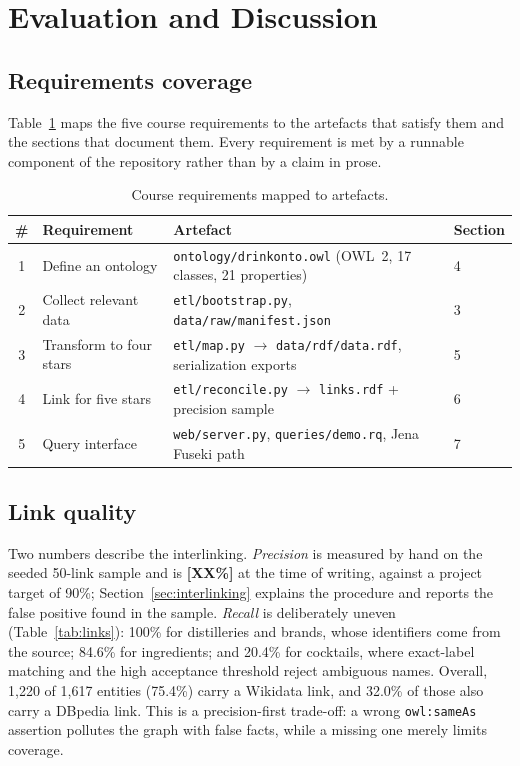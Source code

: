 \section{Evaluation and Discussion}
\label{sec:evaluation}

\subsection{Requirements coverage}

Table~\ref{tab:requirements} maps the five course requirements to the artefacts
that satisfy them and the sections that document them. Every requirement is met
by a runnable component of the repository rather than by a claim in prose.

\begin{table}[h]
  \centering
  \small
  \begin{tabular}{@{}clll@{}}
    \toprule
    \# & Requirement & Artefact & Section \\
    \midrule
    1 & Define an ontology & \texttt{ontology/drinkonto.owl} (OWL~2, 17 classes, 21 properties) & 4 \\
    2 & Collect relevant data & \texttt{etl/bootstrap.py}, \texttt{data/raw/manifest.json} & 3 \\
    3 & Transform to four stars & \texttt{etl/map.py} $\rightarrow$ \texttt{data/rdf/data.rdf}, serialization exports & 5 \\
    4 & Link for five stars & \texttt{etl/reconcile.py} $\rightarrow$ \texttt{links.rdf} + precision sample & 6 \\
    5 & Query interface & \texttt{web/server.py}, \texttt{queries/demo.rq}, Jena Fuseki path & 7 \\
    \bottomrule
  \end{tabular}
  \caption{Course requirements mapped to artefacts.}
  \label{tab:requirements}
\end{table}

\subsection{Link quality}

Two numbers describe the interlinking. \emph{Precision} is measured by hand on
the seeded 50-link sample and is \textbf{[XX\%]} at the time of writing, against
a project target of 90\%; Section~\ref{sec:interlinking} explains the procedure and reports the
false positive found in the sample. \emph{Recall} is deliberately uneven
(Table~\ref{tab:links}): 100\% for distilleries and brands, whose identifiers
come from the source; 84.6\% for ingredients; and 20.4\% for cocktails, where
exact-label matching and the high acceptance threshold reject ambiguous names.
Overall, 1{,}220 of 1{,}617 entities (75.4\%) carry a Wikidata link, and 32.0\%
of those also carry a DBpedia link. This is a precision-first trade-off: a
wrong \texttt{owl:sameAs} assertion pollutes the graph with false facts, while a
missing one merely limits coverage.

